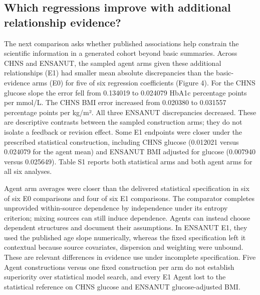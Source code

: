 \documentclass[11pt,letterpaper]{article}
\begin{document}
\subsection{Which regressions improve with additional relationship evidence?}

The next comparison asks whether published associations help constrain the scientific information in a generated cohort beyond basic summaries. Across CHNS and ENSANUT, the sampled agent arms given these additional relationships (E1) had smaller mean absolute discrepancies than the basic-evidence arms (E0) for five of six regression coefficients (Figure 4). For the CHNS glucose slope the error fell from 0.134019 to 0.024079 HbA1c percentage points per mmol/\allowbreak{}L. The CHNS BMI error increased from 0.020380 to 0.031557 percentage points per kg/\allowbreak{}m². All three ENSANUT discrepancies decreased. These are descriptive contrasts between the sampled construction arms; they do not isolate a feedback or revision effect. Some E1 endpoints were closer under the prescribed statistical construction, including CHNS glucose (0.012021 versus 0.024079 for the agent mean) and ENSANUT BMI adjusted for glucose (0.007940 versus 0.025649). Table S1 reports both statistical arms and both agent arms for all six analyses.


Agent arm averages were closer than the delivered statistical specification in six of six E0 comparisons and four of six E1 comparisons. The comparator completes unprovided within-source dependence by independence under its entropy criterion; mixing sources can still induce dependence. Agents can instead choose dependent structures and document their assumptions. In ENSANUT E1, they used the published age slope numerically, whereas the fixed specification left it contextual because source covariates, dispersion and weighting were unbound. These are relevant differences in evidence use under incomplete specification. Five Agent constructions versus one fixed construction per arm do not establish superiority over statistical model search, and every E1 Agent lost to the statistical reference on CHNS glucose and ENSANUT glucose-adjusted BMI.
\end{document}
